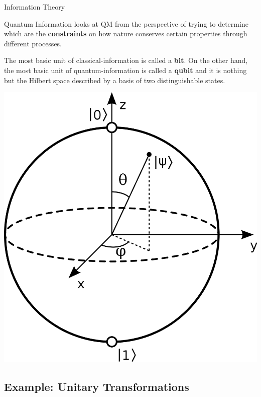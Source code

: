 \documentclass[9pt, handout, aspectratio=169]{beamer}		%
\begin{document}
	\begin{frame}{Information Theory}

		Quantum Information looks at QM from the perspective of trying to determine which are the \textbf{constraints} on how nature conserves certain properties through different processes.

		\begin{multicols}{2}

			The most basic unit of classical-information is called a \textbf{bit}. On the other hand, the most basic unit of quantum-information is called a \textbf{qubit} and it is nothing but the Hilbert space described by a basis of two distinguishable states.

			\columnbreak
			\begin{center}
		\includegraphics[width=.26\paperwidth]{Figures/Bloch_Sphere}
			\end{center}

		\end{multicols}

	\end{frame}


	\subsection{Example: Unitary Transformations}
\end{document}
